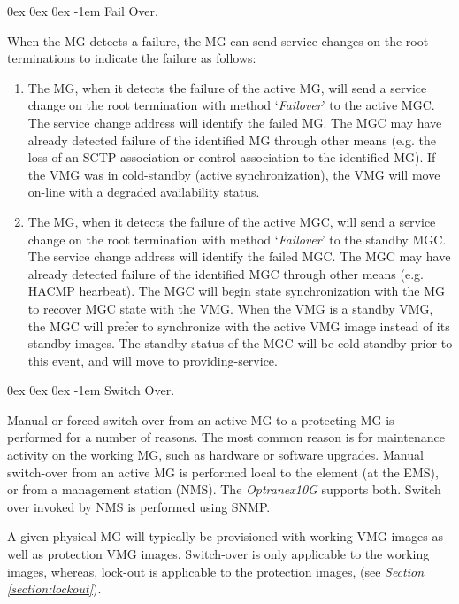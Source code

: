 \documentclass[letterpaper,final,notitlepage,twocolumn,10pt,twoside]{article}
\makeatletter
\let\normalsize = \small
\let\small = \footnotesize
\let\footnotesize = \scriptsize
\let\scriptsize = \tiny
\renewcommand\subparagraph{\@startsection{subparagraph}{5}{\parindent}%
                                       {0ex \@plus 0ex \@minus 0ex}%
                                       {-1em}%
                                      {\normalfont\normalsize\bfseries\slshape}}
\makeatother
\begin{document}
\subparagraph{Fail Over.}

When the MG detects a failure, the MG can send service changes on the root
terminations to indicate the failure as follows:

\begin{enumerate}

\item The MG, when it detects the failure of the active MG, will send a
service change on the root termination with method `{\it Failover}' to the
active MGC.  The service change address will identify the failed MG.  The MGC
may have already detected failure of the identified MG through other means
(e.g. the loss of an SCTP association or control association to the identified
MG).  If the VMG was in cold-standby (active synchronization), the VMG will
move on-line with a degraded availability status.

\item The MG, when it detects the failure of the active MGC, will send a
service change on the root termination with method `{\it Failover}' to the
standby MGC.  The service change address will identify the failed MGC.  The
MGC may have already detected failure of the identified MGC through other
means (e.g. HACMP hearbeat).  The MGC will begin state synchronization with
the MG to recover MGC state with the VMG.  When the VMG is a standby VMG, the
MGC will prefer to synchronize with the active VMG image instead of its
standby images.  The standby status of the MGC will be cold-standby prior to
this event, and will move to providing-service.

\end{enumerate}

\subparagraph{Switch Over.}
\label{section:switchover}

Manual or forced switch-over from an active MG to a protecting MG is performed
for a number of reasons.  The most common reason is for maintenance activity
on the working MG, such as hardware or software upgrades.  Manual switch-over
from an active MG is performed local to the element (at the EMS), or from a
management station (NMS).  The {\sl Optranex10G} supports both.  Switch over
invoked by NMS is performed using SNMP.

A given physical MG will typically be provisioned with working VMG images as
well as protection VMG images.  Switch-over is only applicable to the working
images, whereas, lock-out is applicable to the protection images, (see {\sl
Section \ref{section:lockout}}).
\end{document}
